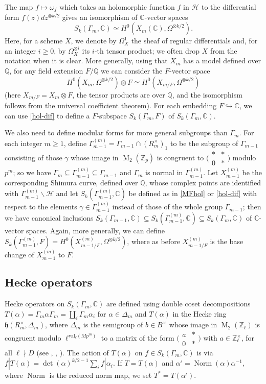 \documentclass[a4paper,11pt]{amsart}
\numberwithin{equation}{section}
\theoremstyle{plain}
\theoremstyle{definition}
\theoremstyle{remark}
\newcommand{\Q}{\mathbb{Q}}
\newcommand{\Z}{\mathbb{Z}}
\newcommand{\C}{\mathbb{C}}
\DeclareMathOperator{\Norm}{Norm}
\DeclareMathOperator{\M}{M}
\newcommand{\val}{\mathrm{val}}
\newcommand{\smallmat}[4]{\bigl(\begin{smallmatrix}#1&#2\\#3&#4\end{smallmatrix}\bigr)}
\begin{document}
The map $f\mapsto \omega_f$ which takes an holomorphic function $f$ in $\mathcal{H}$ to the differential form $f(z)dz^{\otimes{k/2}}$ gives an isomorphism of $\C$-vector spaces 
\begin{equation}\label{hol-dif}
S_k(\Gamma_m,\C)\simeq H^0(X_m(\C),\Omega^{\otimes k/2}).\end{equation}
Here, for a scheme $X$, we denote by $\Omega_X^1$ the sheaf of regular differentials and, for an integer $i\ge 0$, by $\Omega_X^{\otimes i}$ its $i$-th tensor product; we often drop $X$ from the notation when it is clear. More generally, using that $X_m$ has a model defined over $\Q$, for any field extension $F/\Q$ we can consider the $F$-vector space \[H^0(X_m,\Omega^{\otimes k/2})\otimes F\simeq H^0(X_{m/F},\Omega^{\otimes k/2})\] (here $X_{m/F}=X_m\otimes F$, the tensor products are over $\Q$, and the isomorphism follows from the universal coefficient theorem). For each embedding $F\hookrightarrow\C$, we can use \eqref{hol-dif} to define a $F$-subspace $S_k(\Gamma_m,F)$ of $S_k(\Gamma_m,\C)$. 

We also need to define modular forms for more general subgroups than $\Gamma_m$. For each integer $m\geq 1$, define $\Gamma_{m-1}^{(m)}=\Gamma_{m-1}\cap (R_m^\times)_1$ to be the subgroup of $\Gamma_{m-1}$ consisting of those $\gamma$ whose image in 
$\M_2(\Z_p)$ is congruent to $\smallmat {*}{*}{0}{*}$ modulo $p^m$;
so we have $\Gamma_m\subseteq\Gamma_{m-1}^{(m)}\subseteq\Gamma_{m-1}$ and $\Gamma_m$ is normal in $\Gamma_{m-1}^{(m)}$. Let $X_{m-1}^{(m)}$ be the corresponding Shimura curve, defined over $\Q$, whose complex points are identified with $\Gamma_{m-1}^{(m)}\backslash\mathcal{H}$ and let $S_k(\Gamma_{m-1}^{(m)},\C)$ be defined as in \eqref{MFhol} or \eqref{hol-dif} with respect to the elements $\gamma\in\Gamma_{m-1}^{(m)}$ instead of those of the whole group $\Gamma_{m-1}$; then we have canonical inclusions $S_k(\Gamma_{m-1},\C)\subseteq S_k(\Gamma_{m-1}^{(m)},\C)\subseteq S_k(\Gamma_m,\C)$ of $\C$-vector spaces. Again, more generally, we can define $S_k(\Gamma_{m-1}^{(m)},F)=H^0(X_{m-1/F}^{(m)},\Omega^{\otimes{k/2}})$, where as before $X_{m-1/F}^{(m)}$ is the base change of $X_{m-1}^{(m)}$ to $F$. 

\subsection{Hecke operators}\label{secHeckeop}
Hecke operators on $S_k(\Gamma_m,\C)$ are defined using double coset decompositions $T(\alpha)=\Gamma_m\alpha\Gamma_m=\coprod_i\Gamma_m\alpha_i$ 
for $\alpha\in \Delta_m$ 
and $T(\alpha)$ in the Hecke ring $\mathfrak{h}(R_m^\times,\Delta_m)$,
where $\Delta_m$ is the semigroup of $b\in B^\times$ whose image in $\M_2(\Z_\ell)$ is congruent modulo $\ell^{\val_\ell(Mp^m)}$ to a matrix of the form $\smallmat a{*}0{*}$ with $a\in\Z_\ell^\times$, for all $\ell\nmid D$ (see \cite[\S3.1]{shimura}, \cite[\S5.3]{Miyake}, \cite[\S2.1]{LV-IJNT}). The action of $T(\alpha)$ on $f\in S_k(\Gamma_m,\C)$ is via $f|T(\alpha)=\det(\alpha)^{k/2-1}\sum_if|\alpha_i$. If $T=T(\alpha)$ and $\alpha^\iota=\Norm(\alpha)\alpha^{-1}$, where $\Norm$ is the reduced norm map, we set $T^*=T(\alpha^\iota)$. 
\end{document}
